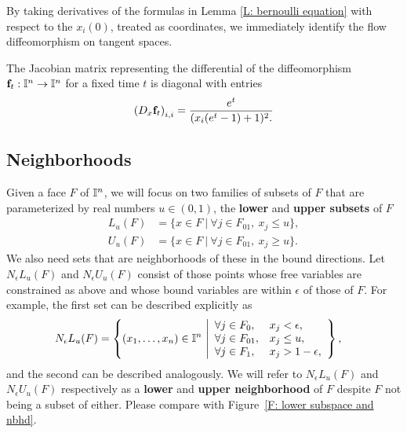 By taking derivatives of the formulas in Lemma \ref{L: bernoulli equation} with respect to the $x_i(0)$, treated as coordinates, we immediately identify the flow diffeomorphism on tangent spaces.

\begin{corollary} \label{C: pushforward of vectors along the flow}
	The Jacobian matrix representing the differential of the diffeomorphism $\mathbf{f}_t:\mathbb{I}^n \to \mathbb{I}^n$ for a fixed time $t$	is diagonal with entries
	\begin{equation*}
	\left(D_x \mathbf{f}_t\right)_{i,i} = \frac{e^t}{(x_i(e^t -1) + 1)^2.}
	\end{equation*}
\end{corollary}

\subsection{Neighborhoods} \label{S: neighborhoods}

Given a face $F$ of $\mathbb{I}^n$, we will focus on two families of subsets of $F$ that are parameterized by real numbers $u \in (0,1)$, the \textbf{lower} and \textbf{upper subsets} of $F$
\begin{align*}
L_u(F) & = \{x \in F\ |\ \forall j \in F_{01},\ x_j \leq u\}, \\
U_u(F) & = \{x \in F\ |\ \forall j \in F_{01},\ x_j \geq u\}.
\end{align*}
We also need sets that are neighborhoods of these in the bound directions.
Let $N_\epsilon L_u(F)$ and $N_\epsilon U_u(F)$ consist of those points whose free variables are constrained as above and whose bound variables are within $\epsilon$ of those of $F$.
For example, the first set can be described explicitly as
\begin{align*}
N_\epsilon L_u (F) & = \left\{(x_1,\ldots, x_n) \in \interval^n\ \middle| 
\begin{array}{ll}
\forall j \in F_0, & x_j < \epsilon, \\
\forall j \in F_{01}, & x_j \leq u, \\
\forall j \in F_1, & x_j>1-\epsilon,
\end{array}\right\},
\end{align*}
and the second can be described analogously.
We will refer to $N_\epsilon L_u(F)$ and $N_\epsilon U_u(F)$ respectively as a \textbf{lower} and \textbf{upper neighborhood} of $F$ despite $F$ not being a subset of either.
Please compare with Figure~\ref{F: lower subspace and nbhd}.

